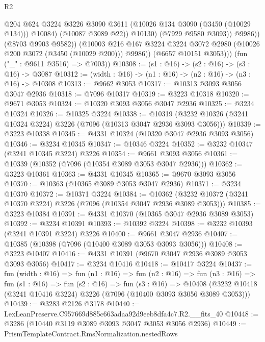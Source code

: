 \begin{lexlean}{R2}
\begin{coremodule}
                          @204
                          @624
                          @3224
                          @3226
                          @3090
                          @3611
                          (@10026 @134 @3090 (@3450 (@10029 @134)))
                          @10084)
                        (@10087 @3089 @22))
                      @10130)
                    (@7929 @9580 @3093))
                  @9986))
              (@8703 @9903 @9582))
            (@10003
              @216
              @167
              @3224
              @3224
              @3072
              @2980
              (@10026 @200 @3072 (@3450 (@10029 @200)))
              @9986))
          (@6657 @10151 @3053)))
      (fun ("_" : @9611 @3516) => @7003))
@10308 := (s1 : @16) -> (s2 : @16) -> (s3 : @16) -> @3087
@10312 := (width : @16) -> (n1 : @16) -> (n2 : @16) -> (n3 : @16) -> @10308
@10313 := @9662 @3053
@10317 := @10313 @3093 @3056 @3047 @2936
@10318 := @7096 @10317
@10319 := @3223 @10318
@10320 := @9671 @3053
@10324 := @10320 @3093 @3056 @3047 @2936
@10325 := @3234 @10324
@10326 := @10325 @3224
@10338 := @10319 (@3232 @10326 (@3241 @10324 @3224) @3226 (@7096 (@10313 @3047 @2936 @3093 @3056)))
@10339 := @3223 @10338
@10345 := @4331 @10324 (@10320 @3047 @2936 @3093 @3056)
@10346 := @3234 @10345
@10347 := @10346 @3224
@10352 := @3232 @10347 (@3241 @10345 @3224) @3226
@10354 := @9661 @3093 @3056
@10361 := @10339 (@10352 (@7096 (@10354 @3089 @3053 @3047 @2936)))
@10362 := @3223 @10361
@10363 := @4331 @10345
@10365 := @9670 @3093 @3056
@10370 := @10363 (@10365 @3089 @3053 @3047 @2936)
@10371 := @3234 @10370
@10372 := @10371 @3224
@10384 := @10362 (@3232 @10372 (@3241 @10370 @3224) @3226 (@7096 (@10354 @3047 @2936 @3089 @3053)))
@10385 := @3223 @10384
@10391 := @4331 @10370 (@10365 @3047 @2936 @3089 @3053)
@10392 := @3234 @10391
@10393 := @10392 @3224
@10398 := @3232 @10393 (@3241 @10391 @3224) @3226
@10400 := @9661 @3047 @2936
@10407 := @10385 (@10398 (@7096 (@10400 @3089 @3053 @3093 @3056)))
@10408 := @3223 @10407
@10416 := @4331 @10391 (@9670 @3047 @2936 @3089 @3053 @3093 @3056)
@10417 := @3234 @10416
@10418 := @10417 @3224
@10437 := fun (width : @16) =>
  fun (n1 : @16) =>
  fun (n2 : @16) =>
  fun (n3 : @16) =>
  fun (s1 : @16) =>
  fun (s2 : @16) =>
  fun (s3 : @16) =>
  @10408 (@3232 @10418 (@3241 @10416 @3224) @3226 (@7096 (@10400 @3093 @3056 @3089 @3053)))
@10439 := @3283 @2126 @3178
@10440 := LexLeanPreserve.C957669d885c663adaa92d9eeb8dfa4c7.R2.__fits_40
@10448 := @3286 (@10440 @3119 @3089 @3093 @3047 @3053 @3056 @2936)
@10449 := PrismTemplateContract.RmsNormalization.nestedRows

\end{coremodule}
\end{lexlean}
